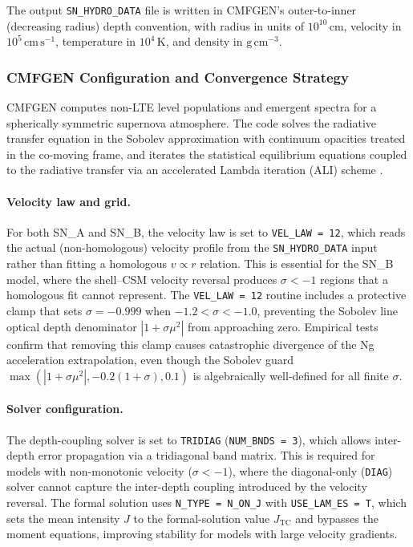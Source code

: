 \documentclass[11pt, a4paper]{article}
\newcommand{\sigmav}{\ensuremath{\sigma}}
\begin{document}
The output \texttt{SN\_HYDRO\_DATA} file is written in CMFGEN's
outer-to-inner (decreasing radius) depth convention, with radius in units
of $10^{10}$\,cm, velocity in $10^5\,\mathrm{cm\,s^{-1}}$, temperature in
$10^4$\,K, and density in $\mathrm{g\,cm^{-3}}$.

\subsubsection{CMFGEN Configuration and Convergence Strategy}
\label{subsubsec:cmfgen_config}

CMFGEN \citep{Hillier1998, HillierDessart2012, Dessart2015} computes
non-LTE level populations and emergent spectra for a spherically symmetric
supernova atmosphere.  The code solves the radiative transfer equation in
the Sobolev approximation with continuum opacities treated in the
co-moving frame, and iterates the statistical equilibrium equations
coupled to the radiative transfer via an accelerated Lambda iteration
(ALI) scheme \citep{RybickiHummer1991}.

\paragraph{Velocity law and grid.}
For both SN\_A and SN\_B, the velocity law is set to
\texttt{VEL\_LAW\,=\,12}, which reads the actual (non-homologous)
velocity profile from the \texttt{SN\_HYDRO\_DATA} input rather than
fitting a homologous $v \propto r$ relation.  This is essential for the
SN\_B model, where the shell--CSM velocity reversal produces
$\sigmav < -1$ regions that a homologous fit cannot represent.  The
\texttt{VEL\_LAW\,=\,12} routine includes a protective clamp that sets
$\sigmav = -0.999$ when $-1.2 < \sigmav < -1.0$, preventing the Sobolev
line optical depth denominator $|1 + \sigmav \mu^2|$ from approaching
zero.  Empirical tests confirm that removing this clamp causes
catastrophic divergence of the Ng acceleration extrapolation, even though
the \citet{Dessart2015} Sobolev guard
$\max(|1 + \sigmav \mu^2|, -0.2(1+\sigmav), 0.1)$ is algebraically
well-defined for all finite $\sigmav$.

\paragraph{Solver configuration.}
The depth-coupling solver is set to \texttt{TRIDIAG}
(\texttt{NUM\_BNDS\,=\,3}), which allows inter-depth error propagation
via a tridiagonal band matrix.  This is required for models with
non-monotonic velocity ($\sigmav < -1$), where the diagonal-only
(\texttt{DIAG}) solver cannot capture the inter-depth coupling introduced
by the velocity reversal.  The formal solution uses
\texttt{N\_TYPE\,=\,N\_ON\_J} with \texttt{USE\_LAM\_ES\,=\,T}, which
sets the mean intensity $J$ to the formal-solution value $J_{\mathrm{TC}}$
and bypasses the moment equations, improving stability for models with
large velocity gradients.
\end{document}
